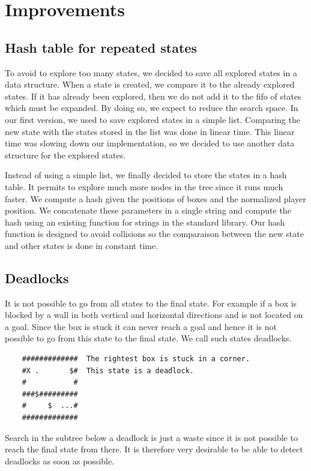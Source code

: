 \documentclass[a4paper,10pt]{article}
\begin{document}
\section{Improvements}
    \subsection{Hash table for repeated states}
    To avoid to explore too many states, we decided to save all explored states in a data structure. 
    When a state is created, we compare it to the already explored states. 
    If it has already been explored, then we do not add it to the fifo of states which must be expanded. 
    By doing so, we expect to reduce the search space. 
    In our first version, we used to save explored states in a simple list.
	Comparing the new state with the states stored in the list was done in linear time.
    This linear time was slowing down our implementation, so we decided to use another data structure for the explored states.
    
    Instead of using a simple list, we finally decided to store the states in a hash table.
    It permits to explore much more nodes in the tree since it runs much faster. 
    We compute a hash given the positions of boxes and the normalized player position. 
    We concatenate these parameters in a single string and compute the hash using an existing function for strings in the standard library.
	Our hash function is designed to avoid collisions so the comparaison between the new state and other states is done in constant time.

	\subsection{Deadlocks}
	It is not possible to go from all states to the final state.  
	For example if a box is blocked by a wall in both vertical and horizontal directions and is not located on a goal.  
	Since the box is stuck it can never reach a goal and hence it is not possible to go from this state to the final state.    
	We call such states deadlocks.

	\begin{verbatim}
	#############  The rightest box is stuck in a corner.
	#X .       $#  This state is a deadlock.
	#           # 
	###$######### 
	#     $  ...# 
	############# 
	\end{verbatim}

        Search in the subtree below a deadlock is just a waste since it is not possible to reach the final state from there.  
        It is therefore very desirable to be able to detect deadlocks as soon as possible.
\end{document}
